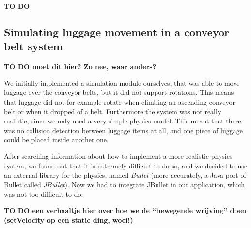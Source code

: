 \textbf{TO DO}

\subsection{Simulating luggage movement in a conveyor belt system}
\textbf{TO DO moet dit hier? Zo nee, waar anders?}

We initially implemented a simulation module ourselves, that was able to move luggage over the conveyor belts, but it did not support rotations. This means that luggage did not for example rotate when climbing an ascending conveyor belt or when it dropped of a belt. Furthermore the system was not really realistic, since we only used a very simple physics model. This meant that there was no collision detection between luggage items at all, and one piece of luggage could be placed inside another one.

After searching information about how to implement a more realistic physics system, we found out that it is extremely difficult to do so, and we decided to use an external library for the physics, named \emph{Bullet} (more accurately, a Java port of Bullet called \emph{JBullet}). Now we had to integrate JBullet in our application, which was not too difficult to do.

\textbf{TO DO een verhaaltje hier over hoe we de ``bewegende wrijving'' doen (setVelocity op een static ding, woei!)}